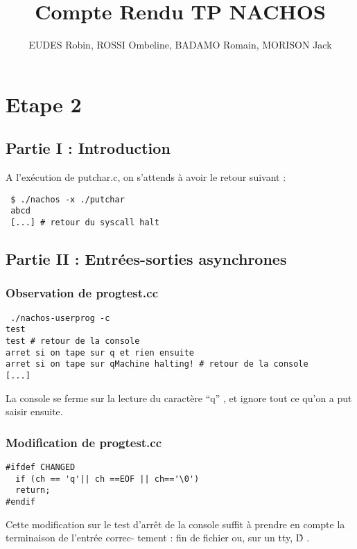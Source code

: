 \documentclass[a4paper,10pt]{article}
\title{Compte Rendu TP NACHOS}
\author{EUDES Robin, ROSSI Ombeline, BADAMO Romain, MORISON Jack}
\begin{document}
\maketitle
\tableofcontents
\newpage
\section{Etape 2}
\subsection{Partie I : Introduction}
A l'exécution de putchar.c, on s'attends à avoir le retour suivant :
\begin{verbatim}
 $ ./nachos -x ./putchar
 abcd
 [...] # retour du syscall halt
\end{verbatim}
\subsection{Partie II : Entrées-sorties asynchrones}
\subsubsection{Observation de progtest.cc}
\begin{verbatim}
 ./nachos-userprog -c
test
test # retour de la console
arret si on tape sur q et rien ensuite
arret si on tape sur qMachine halting! # retour de la console
[...]
\end{verbatim}
La console se ferme sur la lecture du caractère ``q'' , et ignore tout ce qu'on a put saisir ensuite.

\subsubsection{ Modification de progtest.cc}
\begin{verbatim}
#ifdef CHANGED
  if (ch == 'q'|| ch ==EOF || ch=='\0')
  return;
#endif
\end{verbatim}
Cette modification sur le test d'arrêt de la console suffit à prendre en compte la terminaison de l’entrée correc-
tement : fin de fichier ou, sur un tty, \^D .
\end{document}
